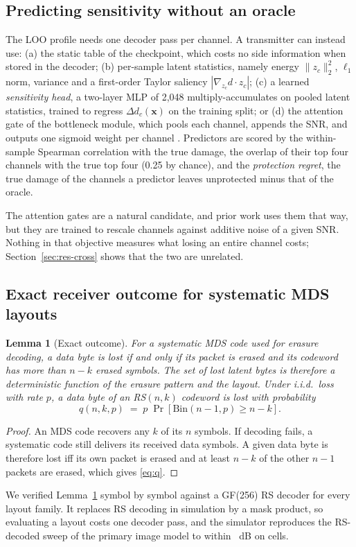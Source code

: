 \documentclass[journal]{IEEEtran}
\newtheorem{lemma}{Lemma}
\begin{document}
\subsection{Predicting sensitivity without an oracle}
The LOO profile needs one decoder pass per channel. A transmitter can instead use: (a) the static table
of the checkpoint, which costs no side information when stored in the decoder; (b) per-sample latent
statistics, namely energy $\|z_c\|_2^2$, $\ell_1$ norm, variance and a first-order Taylor saliency
$|\nabla_{z_c} d\cdot z_c|$; (c) a learned \emph{sensitivity head}, a two-layer MLP of 2,048
multiply-accumulates on pooled latent statistics, trained to regress $\Delta d_c(\mathbf{x})$ on the
training split; or (d) the attention gate of the bottleneck module, which pools each channel, appends the
SNR, and outputs one sigmoid weight per channel \cite{xu2022adjscc}. Predictors are scored by the
within-sample Spearman correlation with the true damage, the overlap of their top four channels with
the true top four (0.25 by chance), and the \emph{protection regret}, the true damage of the channels a
predictor leaves unprotected minus that of the oracle.

The attention gates are a natural candidate, and prior work uses them that way, but they are trained to
rescale channels against additive noise of a given SNR. Nothing in that objective measures what losing
an entire channel costs; Section~\ref{sec:res-cross} shows that the two are unrelated.

\subsection{Exact receiver outcome for systematic MDS layouts}
\begin{lemma}[Exact outcome]\label{lem:exact}
For a systematic MDS code used for erasure decoding, a data byte is lost if and only if its packet is
erased and its codeword has more than $n-k$ erased symbols. The set of lost latent bytes is therefore a
deterministic function of the erasure pattern and the layout. Under i.i.d.\ loss with rate $p$, a data
byte of an RS$(n,k)$ codeword is lost with probability
\begin{equation}
q(n,k,p) \;=\; p\;\Pr\!\left[\mathrm{Bin}(n-1,p)\ge n-k\right]. \label{eq:q}
\end{equation}
\end{lemma}
\begin{proof}
An MDS code recovers any $k$ of its $n$ symbols. If decoding fails, a systematic code still delivers its
received data symbols. A given data byte is therefore lost iff its own packet is erased and at least
$n-k$ of the other $n-1$ packets are erased, which gives \eqref{eq:q}.
\end{proof}
We verified Lemma~\ref{lem:exact} symbol by symbol against a GF(256) RS decoder for every layout family.
It replaces RS decoding in simulation by a mask product, so evaluating a layout costs one decoder pass,
and the simulator reproduces the RS-decoded sweep of the primary image model to within
\ReferenceMaxDiff~dB on \ReferenceCells{} cells.
\end{document}
